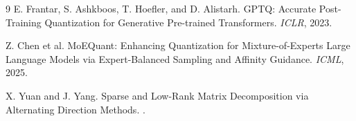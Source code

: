 \documentclass[11pt]{article}
\theoremstyle{plain}
\theoremstyle{definition}
\theoremstyle{remark}
\begin{document}
\begin{thebibliography}{9}
\small
{}
E. Frantar, S. Ashkboos, T. Hoefler, and D. Alistarh.
\newblock GPTQ: Accurate Post-Training Quantization for Generative Pre-trained Transformers.
\newblock \emph{ICLR}, 2023.

Z. Chen et al.
\newblock MoEQuant: Enhancing Quantization for Mixture-of-Experts Large Language Models via Expert-Balanced Sampling and Affinity Guidance.
\newblock \emph{ICML}, 2025.

X. Yuan and J. Yang.
\newblock Sparse and Low-Rank Matrix Decomposition via Alternating Direction Methods.
.
\end{thebibliography}
\end{document}
